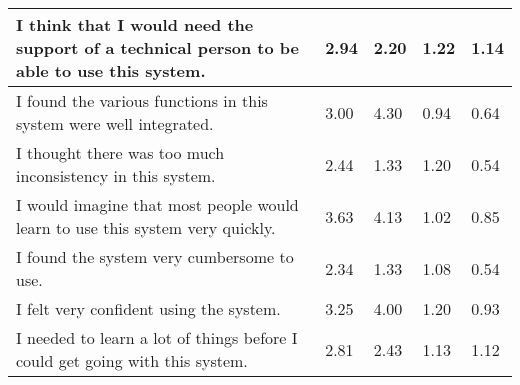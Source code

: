 \begin{table}[tb]
\begin{tabular}{@{}|m{6cm}R{1.7cm}R{1.7cm}R{1.7cm}R{1.7cm}|@{}}
    I think that I would need the support of a technical person to be able to use this system. & 2.94                                            & 2.20                                         & 1.22                                            & 1.14                                          \\ \midrule
    I found the various functions in this system were well integrated.                         & 3.00                                            & 4.30                                         & 0.94                                            & 0.64                                          \\ \midrule
    I thought there was too much inconsistency in this system.                                 & 2.44                                            & 1.33                                         & 1.20                                            & 0.54                                          \\ \midrule
    I would imagine that most people would learn to use this system very quickly.              & 3.63                                            & 4.13                                         & 1.02                                            & 0.85                                          \\ \midrule
    I found the system very cumbersome to use.                                                 & 2.34                                            & 1.33                                         & 1.08                                            & 0.54                                          \\ \midrule
    I felt very confident using the system.                                                    & 3.25                                            & 4.00                                         & 1.20                                            & 0.93                                          \\ \midrule
    I needed to learn a lot of things before I could get going with this system.               & 2.81                                            & 2.43                                         & 1.13                                            & 1.12                                          \\ \bottomrule
    \end{tabular}
    \end{table}

